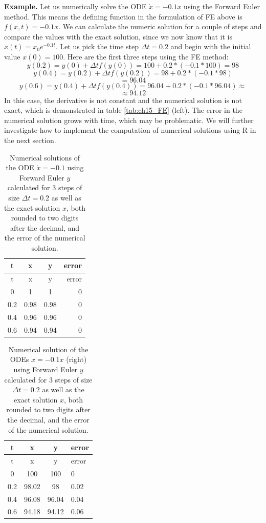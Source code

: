 \documentclass[
]{book}
\theoremstyle{definition}
\theoremstyle{definition}
\theoremstyle{definition}
\theoremstyle{remark}
\begin{document}
\textbf{Example.} Let us numerically solve the ODE \(\dot x = -0.1x\) using the Forward Euler method. This means the defining function in the formulation of FE above is \(f(x,t)=-0.1x\). We can calculate the numeric solution for a couple of steps and compare the values with the exact solution, since we now know that it is \(x(t) = x_0 e^{-0.1t}\). Let us pick the time step \(\Delta t = 0.2\) and begin with the initial value \(x(0)=100\). Here are the first three steps using the FE method:
\[ y(0.2) = y(0) + \Delta t f(y(0)) = 100 + 0.2*(-0.1*100) = 98\]
\[ y(0.4) = y(0.2) + \Delta t f(y(0.2)) = 98+ 0.2*(-0.1*98) \]
\[ = 96.04\]
\[ y(0.6) = y(0.4) + \Delta t f(y(0.4)) = 96.04+ 0.2*(-0.1*96.04) \approx  \]
\[ \approx 94.12\]
In this case, the derivative is not constant and the numerical solution is not exact, which is demonstrated in table \ref{tab:ch15_FE} (left). The error in the numerical solution grows with time, which may be problematic. We will further investigate how to implement the computation of numerical solutions using R in the next section.

\begin{longtable}[]{@{}cccr@{}}
\caption{Numerical solutions of the ODE \(\dot x = -0.1\) using Forward Euler \(y\) calculated for 3 steps of size \(\Delta t = 0.2\) as well as the exact solution \(x\), both rounded to two digits after the decimal, and the error of the numerical solution.}\tabularnewline
\toprule
t & x & y & error\tabularnewline
\midrule
\endfirsthead
\toprule
t & x & y & error\tabularnewline
\midrule
\endhead
0 & 1 & 1 & 0\tabularnewline
0.2 & 0.98 & 0.98 & 0\tabularnewline
0.4 & 0.96 & 0.96 & 0\tabularnewline
0.6 & 0.94 & 0.94 & 0\tabularnewline
\bottomrule
\end{longtable}

\begin{longtable}[]{@{}cccl@{}}
\caption{Numerical solution of the ODEs \(\dot x = -0.1x\) (right) using Forward Euler \(y\) calculated for 3 steps of size \(\Delta t = 0.2\) as well as the exact solution \(x\), both rounded to two digits after the decimal, and the error of the numerical solution.}\tabularnewline
\toprule
t & x & y & error\tabularnewline
\midrule
\endfirsthead
\toprule
t & x & y & error\tabularnewline
\midrule
\endhead
0 & 100 & 100 & 0\tabularnewline
0.2 & 98.02 & 98 & 0.02\tabularnewline
0.4 & 96.08 & 96.04 & 0.04\tabularnewline
0.6 & 94.18 & 94.12 & 0.06\tabularnewline
\bottomrule
\end{longtable}

\label{tab:ch15_FE}
\end{document}
